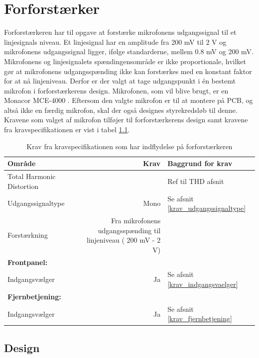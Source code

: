 \chapter{Forforstærker}

Forforstærkeren har til opgave at forstærke mikrofonens udgangssignal til et linjesignals niveau. Et linjesignal har en amplitude fra 200 mV til 2 V og mikrofonens udgangssignal ligger, ifølge standarderne, mellem 0.8 mV og 200 mV. Mikrofonens og linjesignalets spændingensområde er ikke proportionale, hvilket gør at mikrofonens udgangsspænding ikke kan forstærkes med en konstant faktor for at nå linjeniveau. Derfor er der valgt at tage udgangspunkt i én bestemt mikrofon i forforstærkerens design.
Mikrofonen, som vil blive brugt, er en Monacor MCE-4000 . Eftersom den valgte mikrofon er til at montere på PCB, og altså ikke en færdig mikrofon, skal der også designes styrekredsløb til denne. Kravene som valget af mikrofon tilføjer til forforstærkerens design samt kravene fra kravspecifikationen er vist i tabel \ref{tab:krav_forforstaerker}. 

\begin{table}[h]
\centering
\begin{tabular}{l|r|l}
\hline\hline
Område & Krav & Baggrund for krav \\
\hline\hline
Total Harmonic Distortion & \color{red}{<1 \%} & Ref til THD afsnit \\
Udgangssignaltype & Mono & Se afsnit \ref{krav_udgangssignaltype} \\
Forstærkning & Fra mikrofonens udgangsspænding til linjeniveau ( 200 mV - 2 V) & \\
\textbf{Frontpanel:} & & \\
Indgangsvælger & Ja & Se afsnit \ref{krav_indgangsvaelger} \\
\textbf{Fjernbetjening:} & & \\
Indgangsvælger & Ja &  Se afsnit \ref{krav_fjernbetjening}\\
\hline\hline
\end{tabular}
\caption{Krav fra kravspecifikationen som har indflydelse på forforstærkeren}
\label{tab:krav_forforstaerker}
\end{table}



\section{Design}


